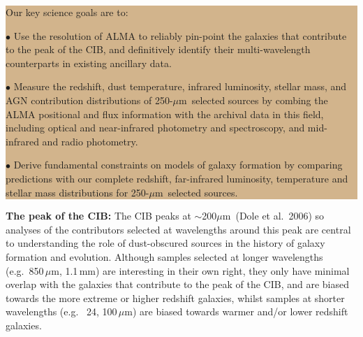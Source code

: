 \documentclass[12pt,a4paper]{article}
\newcommand{\herschel}{{\it Herschel}}
\newcommand{\ea}{et~al.}
\newcommand{\micron}{$\mu$m}
\begin{document}
\indent\indent\colorbox{tan}{
\begin{minipage}{16cm}
\noindent Our key science goals are to:

$\bullet$ Use the resolution of ALMA to reliably pin-point the galaxies
that contribute to the peak of the CIB, and definitively identify
their multi-wavelength counterparts in existing ancillary data.


$\bullet$ Measure the redshift, dust temperature, infrared luminosity,
stellar mass, and AGN contribution distributions of 250-\micron\
selected sources by combing the ALMA positional and flux information
with the archival data in this field, including optical and
near-infrared photometry and spectroscopy, and mid-infrared and radio
photometry.

$\bullet$ Derive fundamental constraints on models of galaxy formation
by comparing predictions with our complete redshift, far-infrared
luminosity, temperature and stellar mass distributions for
250-\micron\ selected sources.

\end{minipage}}

{\bf The peak of the CIB: }
%
The CIB peaks at $\sim$200\micron\ (Dole et al.\ 2006) so analyses of
the contributors selected at wavelengths around this peak are
central to understanding the role of dust-obscured sources in the
history of galaxy formation and evolution. Although samples selected at longer wavelengths (e.g.\ 850\,\micron,
1.1\,mm) are interesting in their own right, they only have minimal overlap 
with the galaxies that contribute to the peak of the CIB, and are biased towards the more extreme or higher redshift galaxies, whilst samples at shorter wavelengths (e.g. \ 24, 100\,\micron) are biased towards warmer and/or lower redshift galaxies.
\end{document}
